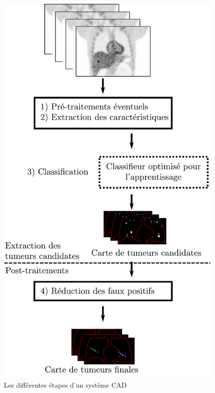 \begin{figure}[h]
	\begin{center}
	\includegraphics[width=12cm]{images/principeCAD}
	\end{center}
	\caption{Les différentes étapes d'un système CAD}
	\label{fig:presSystemesCAD}
\end{figure}


